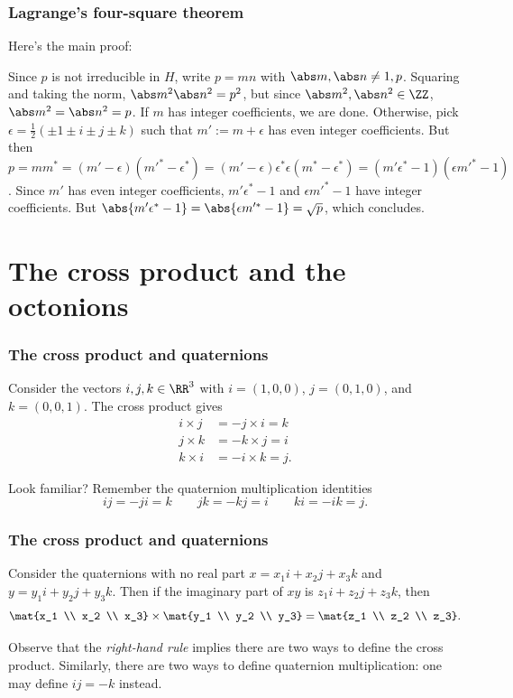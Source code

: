 \documentclass{beamer}
\begin{document}
\begin{frame}
	\frametitle{Lagrange's four-square theorem}
	Here's the main proof:
	\begin{itemize}
		\ii Since $p$ is not irreducible in $H$, write $p = mn$ with $\abs m,\abs n \neq 1,p$.
		\ii Squaring and taking the norm, $\abs m^2\abs n^2 = p^2$, but since $\abs m^2,\abs n^2 \in \ZZ$, $\abs m^2 = \abs n^2 = p$.
		\ii If $m$ has integer coefficients, we are done. Otherwise, pick $\epsilon = \frac12(\pm 1 \pm i \pm j \pm k)$ such that $m' := m + \epsilon$ has even integer coefficients.
		\ii But then $p = mm^* = (m' - \epsilon)(m'^* - \epsilon^*) = (m' - \epsilon)\epsilon^*\epsilon(m^* - \epsilon^*) = (m'\epsilon^* - 1)(\epsilon m'^* - 1)$.
		\ii Since $m'$ has even integer coefficients, $m'\epsilon^* - 1$ and $\epsilon m'^* - 1$ have integer coefficients.
		\ii But $\abs{m'\epsilon^* - 1} = \abs{\epsilon m'^* - 1} = \sqrt p$, which concludes.
	\end{itemize}
\end{frame}

\section{The cross product and the octonions}

\begin{frame}
	\frametitle{The cross product and quaternions}
	Consider the vectors $i,j,k \in \RR^3$ with $i = (1,0,0)$, $j = (0,1,0)$, and $k = (0,0,1)$. The cross product gives
	\begin{align*}
		i \times j &= -j \times i = k \\
		j \times k &= -k \times j = i \\
		k \times i &= -i \times k = j.
	\end{align*}

	Look familiar? Remember the quaternion multiplication identities
	\[ij = -ji = k \qquad jk = -kj = i \qquad ki = -ik = j.\]
\end{frame}

\begin{frame}
	\frametitle{The cross product and quaternions}
	Consider the quaternions with no real part $x = x_1i + x_2j + x_3k$ and $y = y_1i + y_2j + y_3k$. Then if the imaginary part of $xy$ is $z_1i + z_2j + z_3k$, then
	\[\mat{x_1 \\ x_2 \\ x_3} \times \mat{y_1 \\ y_2 \\ y_3} = \mat{z_1 \\ z_2 \\ z_3}.\]
	
	Observe that the \emph{right-hand rule} implies there are two ways to define the cross product. Similarly, there are two ways to define quaternion multiplication: one may define $ij = -k$ instead.
\end{frame}
\end{document}
